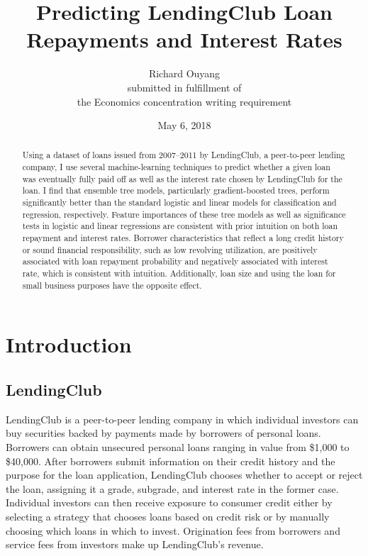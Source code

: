 \documentclass[12pt]{article}
\title{Predicting LendingClub Loan Repayments and Interest Rates}
\author{Richard Ouyang\\\small{submitted in fulfillment of}\\ \small{the Economics concentration writing requirement}}
\date{May 6, 2018}
\begin{document}
\maketitle

\begin{abstract}
Using a dataset of loans issued from 2007--2011 by LendingClub, a peer-to-peer lending company, I use several machine-learning techniques to predict whether a given loan was eventually fully paid off as well as the interest rate chosen by LendingClub for the loan. I find that ensemble tree models, particularly gradient-boosted trees, perform significantly better than the standard logistic and linear models for classification and regression, respectively. Feature importances of these tree models as well as significance tests in logistic and linear regressions are consistent with prior intuition on both loan repayment and interest rates. Borrower characteristics that reflect a long credit history or sound financial responsibility, such as low revolving utilization, are positively associated with loan repayment probability and negatively associated with interest rate, which is consistent with intuition. Additionally, loan size and using the loan for small business purposes have the opposite effect.
\end{abstract}

\newpage
\tableofcontents

\newpage
\section{Introduction}

\subsection{LendingClub}

LendingClub \cite{lendingclub} is a peer-to-peer lending company in which individual investors can buy securities backed by payments made by borrowers of personal loans. Borrowers can obtain unsecured personal loans ranging in value from \$1,000 to \$40,000. After borrowers submit information on their credit history and the purpose for the loan application, LendingClub chooses whether to accept or reject the loan, assigning it a grade, subgrade, and interest rate in the former case. Individual investors can then receive exposure to consumer credit either by selecting a strategy that chooses loans based on credit risk or by manually choosing which loans in which to invest. Origination fees from borrowers and service fees from investors make up LendingClub's revenue.
\end{document}

